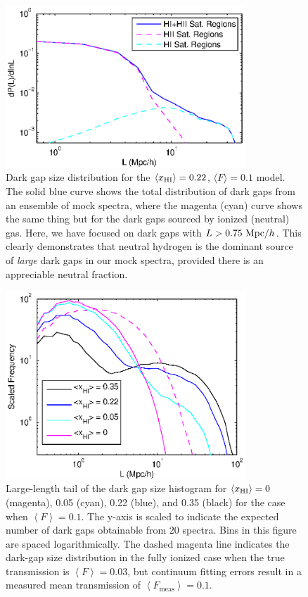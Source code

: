\begin{figure}[!ht]
  \centering
  \includegraphics[width=9cm]{fig2.eps}
  \caption{Dark gap size distribution for the $\langle x_{\text{HI}}\rangle = 0.22$, $\langle F \rangle = 0.1$ model. The solid blue curve shows the total distribution of dark gaps from an ensemble of mock spectra, where the magenta (cyan) curve shows the same thing but for the dark gaps sourced by ionized (neutral) gas. Here, we have focused on dark gaps with $L > 0.75 \ \text{Mpc/$h$}$. This clearly demonstrates that neutral hydrogen is the dominant source of {\em large} dark gaps in our mock spectra, provided there is an appreciable neutral fraction.}
  \label{fig:DarkGapHist}
\end{figure}


\begin{figure}[!ht]
  \centering
  \includegraphics[width=9cm]{fig3.eps}
  \caption{Large-length tail of the dark gap size histogram for $\langle x_{\text{HI}}\rangle = 0$ (magenta), 0.05 (cyan), 0.22 (blue), and 0.35 (black) for the case when $\left\langle F \right\rangle = 0.1$. The y-axis is scaled to indicate the expected number of dark gaps obtainable from 20 spectra. Bins in this figure are spaced logarithmically. The dashed magenta line indicates the dark-gap size distribution in the fully ionized case when the true transmission is $\left\langle F \right\rangle = 0.03$, but continuum fitting errors result in a measured mean transmission of $\left\langle F_{\text{meas}} \right\rangle = 0.1$.}
  \label{fig:PDFs}
\end{figure}


